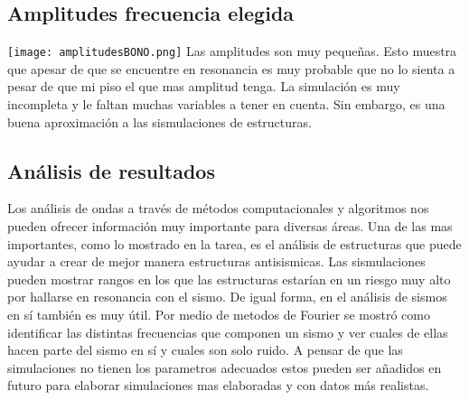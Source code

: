 \documentclass[11pt,letterpaper]{exam}
\begin{document}
\subsection{ Amplitudes frecuencia elegida}
\texttt{[image: amplitudesBONO.png]}
Las amplitudes son muy pequeñas. Esto muestra que apesar de que se encuentre en resonancia es muy probable que no lo sienta a pesar de que mi piso el que mas amplitud tenga. La simulación es muy incompleta y le faltan muchas variables a tener en cuenta. Sin embargo, es una buena aproximación a las sismulaciones de estructuras.


\subsection{ Análisis de resultados }
Los análisis de ondas a través de métodos computacionales y algoritmos nos pueden ofrecer información muy importante para diversas áreas. Una de las mas importantes, como lo mostrado en la tarea, es el análisis de estructuras que puede ayudar a crear de mejor manera estructuras antisismicas. Las sismulaciones pueden mostrar rangos en los que las estructuras estarían en un riesgo muy alto por hallarse en resonancia con el sismo. De igual forma, en el análisis de sismos en sí también es muy útil. Por medio de metodos de Fourier se mostró como identificar las distintas frecuencias que componen un sismo y ver cuales de ellas hacen parte del sismo en sí y cuales son solo ruido. A pensar de que las simulaciones no tienen los parametros adecuados estos pueden ser añadidos en futuro para elaborar simulaciones mas elaboradas y con datos más realistas.
\end{document}
